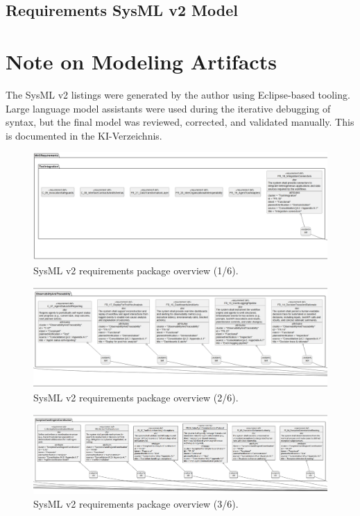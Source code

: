 \clearpage
\subsection*{Requirements SysML v2 Model}\label{app:req-mod}
\section*{Note on Modeling Artifacts}
The SysML v2 listings were generated by the author using Eclipse-based tooling. 
Large language model assistants were used during the iterative debugging of syntax, 
but the final model was reviewed, corrected, and validated manually. 
This is documented in the KI-Verzeichnis.

\begin{figure}[htbp]
  \centering
  \includegraphics[width=\linewidth]{ressources/MAS/figures/MASRequirements/MASRequirements1.jpeg}
  \caption{SysML v2 requirements package overview (1/6).}
  \label{fig:mas-reqs-1}
\end{figure}
\begin{figure}[htbp]
  \centering
  \includegraphics[width=\linewidth]{ressources/MAS/figures/MASRequirements/MASRequirements2.jpeg}
  \caption{SysML v2 requirements package overview (2/6).}
  \label{fig:mas-reqs-2}
\end{figure}
\begin{figure}[htbp]
  \centering
  \includegraphics[width=\linewidth]{ressources/MAS/figures/MASRequirements/MASRequirements3.jpeg}
  \caption{SysML v2 requirements package overview (3/6).}
  \label{fig:mas-reqs-3}
\end{figure}
